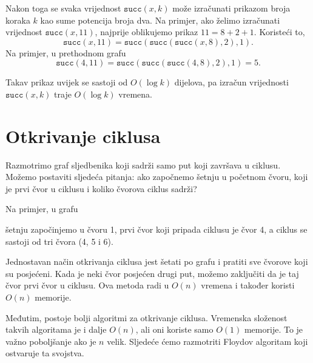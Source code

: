 Nakon toga se svaka vrijednost $\texttt{succ}(x,k)$ može izračunati
prikazom broja koraka $k$ kao sume potencija broja dva.
Na primjer, ako želimo izračunati vrijednost $\texttt{succ}(x,11)$,
najprije oblikujemo prikaz $11=8+2+1$.
Koristeći to,
\[\texttt{succ}(x,11)=\texttt{succ}(\texttt{succ}(\texttt{succ}(x,8),2),1).\]
Na primjer, u prethodnom grafu
\[\texttt{succ}(4,11)=\texttt{succ}(\texttt{succ}(\texttt{succ}(4,8),2),1)=5.\]

Takav prikaz uvijek se sastoji od
$O(\log k)$ dijelova, pa izračun vrijednosti $\texttt{succ}(x,k)$
traje $O(\log k)$ vremena.

\section{Otkrivanje ciklusa}


Razmotrimo graf sljedbenika koji sadrži samo
put koji završava u ciklusu.
Možemo postaviti sljedeća pitanja:
ako započnemo šetnju u početnom čvoru,
koji je prvi čvor u ciklusu
i koliko čvorova ciklus sadrži?

Na primjer, u grafu

\begin{center}
\end{center}
šetnju započinjemo u čvoru 1,
prvi čvor koji pripada ciklusu je čvor 4, a ciklus se sastoji
od tri čvora (4, 5 i 6).

Jednostavan način otkrivanja ciklusa jest šetati po
grafu i pratiti
sve čvorove koji su posjećeni. Kada je neki čvor posjećen
drugi put, možemo zaključiti
da je taj čvor prvi čvor u ciklusu.
Ova metoda radi u $O(n)$ vremena i također koristi
$O(n)$ memorije.

Međutim, postoje bolji algoritmi za otkrivanje ciklusa.
Vremenska složenost takvih algoritama je i dalje $O(n)$,
ali oni koriste samo $O(1)$ memorije.
To je važno poboljšanje ako je $n$ velik.
Sljedeće ćemo razmotriti Floydov algoritam koji
ostvaruje ta svojstva.

